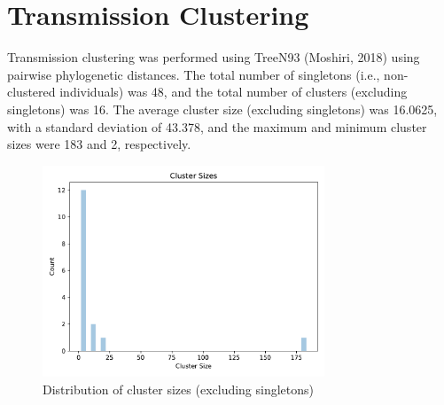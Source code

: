 \documentclass{article}
\begin{document}
\section{Transmission Clustering}
Transmission clustering was performed using TreeN93 (Moshiri, 2018) using pairwise phylogenetic distances.
The total number of singletons (i.e., non-clustered individuals) was 48,
and the total number of clusters (excluding singletons) was 16.
The average cluster size (excluding singletons) was 16.0625,
with a standard deviation of 43.378,
and the maximum and minimum cluster sizes were 183 and 2, respectively.


\begin{figure}[h]
\centering
\includegraphics[width=0.75\textwidth,keepaspectratio]{./figs/cluster_sizes.pdf}
\caption{Distribution of cluster sizes (excluding singletons)}
\end{figure}
\end{document}

